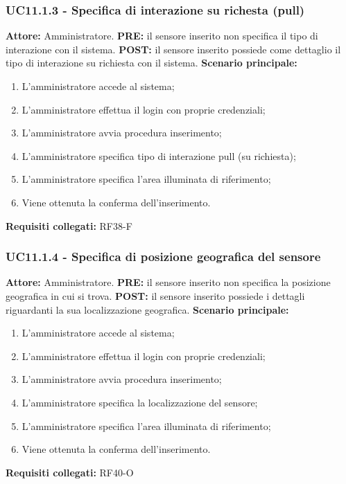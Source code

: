 \documentclass[a4paper, 12pt]{article}
\begin{document}
\subsubsection{UC11.1.3 - Specifica di interazione su richesta (pull)}
\textbf{Attore:} Amministratore.\newline
\textbf{PRE:} il sensore inserito non specifica il tipo di interazione con il sistema.\newline
\textbf{POST:} il sensore inserito possiede come dettaglio il tipo di interazione su richiesta con il sistema.\newline
\textbf{Scenario principale:}
\begin{enumerate}
    \item L'amministratore accede al sistema;
    \item L'amministratore effettua il login con proprie credenziali;
    \item L'amministratore avvia procedura inserimento;
    \item L'amministratore specifica tipo di interazione pull (su richiesta);
    \item L'amministratore specifica l'area illuminata di riferimento;
    \item Viene ottenuta la conferma dell'inserimento.
\end{enumerate}
\textbf{Requisiti collegati:} RF38-F\newline

\subsubsection{UC11.1.4 - Specifica di posizione geografica del sensore}
\textbf{Attore:} Amministratore.\newline
\textbf{PRE:} il sensore inserito non specifica la posizione geografica in cui si trova.\newline
\textbf{POST:} il sensore inserito possiede i dettagli riguardanti la sua localizzazione geografica.\newline
\textbf{Scenario principale:}
\begin{enumerate}
    \item L'amministratore accede al sistema;
    \item L'amministratore effettua il login con proprie credenziali;
    \item L'amministratore avvia procedura inserimento;
    \item L'amministratore specifica la localizzazione del sensore;
    \item L'amministratore specifica l'area illuminata di riferimento;
    \item Viene ottenuta la conferma dell'inserimento.
\end{enumerate}
\textbf{Requisiti collegati:} RF40-O\newline
\end{document}
